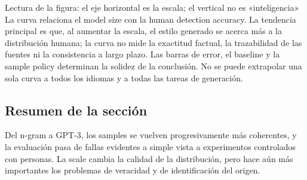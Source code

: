 \begin{knowledgebox}{Lectura de la figura: el eje horizontal es la escala; el vertical no es «inteligencia»}
La curva relaciona el model size con la human detection accuracy. La tendencia principal es que, al aumentar la escala, el estilo generado se acerca más a la distribución humana; la curva no mide la exactitud factual, la trazabilidad de las fuentes ni la consistencia a largo plazo. Las barras de error, el baseline y la sample policy determinan la solidez de la conclusión. No se puede extrapolar una sola curva a todos los idiomas y a todas las tareas de generación.
\end{knowledgebox}

\subsection{Resumen de la sección}

Del n-gram a GPT-3, los samples se vuelven progresivamente más coherentes, y la evaluación pasa de fallas evidentes a simple vista a experimentos controlados con personas. La scale cambia la calidad de la distribución, pero hace aún más importantes los problemas de veracidad y de identificación del origen.
